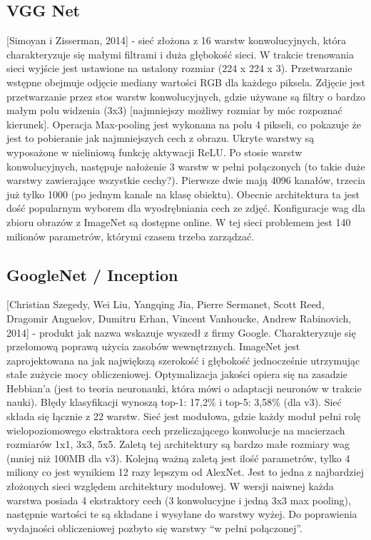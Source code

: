 \documentclass[12pt,a4paper,twoside,titlepage,openright]{book}
\begin{document}
\subsection{VGG Net}
 [Simoyan i Zisserman, 2014] - sieć złożona z 16 warstw konwolucyjnych, która charakteryzuje się małymi filtrami i duża głębokość sieci.
W trakcie trenowania sieci wyjście jest ustawione na ustalony rozmiar (224 x 224 x 3). Przetwarzanie wstępne obejmuje odjęcie mediany wartości RGB dla każdego piksela. Zdjęcie jest przetwarzanie przez stos warstw konwolucyjnych, gdzie używane są filtry o bardzo małym polu widzenia (3x3) [najmniejszy możliwy rozmiar by móc rozpoznać kierunek]. Operacja Max-pooling jest wykonana na polu 4 pikseli, co pokazuje że jest to pobieranie jak najmniejszych cech z obrazu. Ukryte warstwy są wyposażone w nieliniową funkcję aktywacji ReLU. Po stosie warstw konwolucyjnych, następuje nałożenie 3 warstw w pełni połączonych (to takie duże warstwy zawierające wszystkie cechy?). Pierwsze dwie mają 4096 kanałów, trzecia już tylko 1000 (po jednym kanale na klasę obiektu). Obecnie architektura ta jest dość popularnym wyborem dla wyodrębniania cech ze zdjęć. Konfiguracje wag dla zbioru obrazów z ImageNet są dostępne online. W tej sieci problemem jest 140 milionów parametrów, którymi czasem trzeba zarządzać. \cite{DBLP:journals/corr/SimonyanZ14a}

\subsection{GoogleNet / Inception}
[Christian Szegedy, Wei Liu, Yangqing Jia, Pierre Sermanet, Scott Reed, Dragomir Anguelov, Dumitru Erhan, Vincent Vanhoucke, Andrew Rabinovich, 2014] - produkt jak nazwa wskazuje wyszedł z firmy Google. Charakteryzuje się przełomową poprawą użycia zasobów wewnętrznych. ImageNet jest zaprojektowana na jak największą szerokość i głębokość jednocześnie utrzymując stałe zużycie mocy obliczeniowej. Optymalizacja jakości opiera się na zasadzie Hebbian’a (jest to teoria neuronauki, która mówi o adaptacji neuronów w trakcie nauki). Błędy klasyfikacji wynoszą top-1: 17,2\% i top-5: 3,58\% (dla v3). Sieć składa się łącznie z 22 warstw. Sieć jest modułowa, gdzie każdy moduł pełni rolę wielopoziomowego ekstraktora cech przeliczającego konwolucje na macierzach rozmiarów 1x1, 3x3, 5x5. Zaletą tej architektury są bardzo małe rozmiary wag (mniej niż 100MB dla v3). Kolejną ważną zaletą jest ilość parametrów, tylko 4 miliony co jest wynikiem 12 razy lepszym od AlexNet. Jest to jedna z najbardziej złożonych sieci względem architektury modułowej. W wersji naiwnej każda warstwa posiada 4 ekstraktory cech (3 konwolucyjne i jedną 3x3 max pooling), następnie wartości te są składane i wysyłane do warstwy wyżej. Do poprawienia wydajności obliczeniowej pozbyto się warstwy “w pełni połączonej”. \cite{DBLP:journals/corr/SzegedyLJSRAEVR14}
\end{document}
